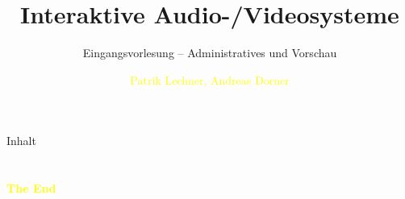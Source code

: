 \documentclass[aspectratio=43]{beamer}
\title{Interaktive Audio-/Videosysteme} %
\subtitle{Eingangsvorlesung -- Administratives und Vorschau}
\author[Lechner/Dorner]{\textcolor{yellow}{Patrik Lechner, Andreas Dorner}}
\institute[IC\textbackslash M/T]{
    \\%
    \textcolor{white}{FH St.Pölten}%
} %
\begin{document}
    
    \frame{\titlepage}
    
    \begin{frame}{Inhalt}
        \tableofcontents
    \end{frame}
        
    
    
    
    
    


    
    
    

    \section{}
    \begin{frame}{}
        \centering
            \Huge\bfseries
        \textcolor{yellow}{The End}
    \end{frame}
\end{document}
